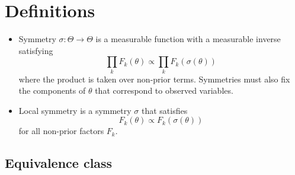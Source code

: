 \documentclass{article}
\begin{document}
\section{Definitions}

\begin{itemize}

\item
Symmetry $\sigma:\Theta\rightarrow\Theta$ is a measurable function with a measurable inverse satisfying
\[
\prod_kF_k(\theta)\propto\prod_kF_k\left(\sigma(\theta)\right)
\]
where the product is taken over non-prior terms. Symmetries must also fix the components of $\theta$ that correspond to observed variables.

\item
Local symmetry is a symmetry $\sigma$ that satisfies
\[
F_k(\theta) \propto F_k\left(\sigma(\theta)\right)
\]
for all non-prior factors $F_k$.

\end{itemize}

\subsection{Equivalence class}
\end{document}
